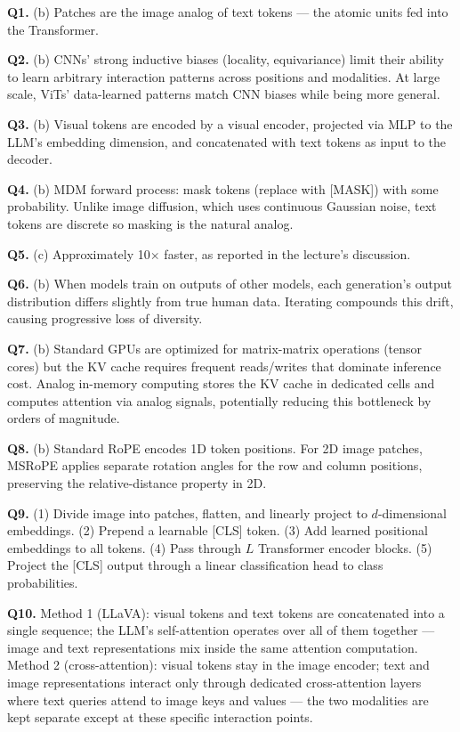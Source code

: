 \documentclass[11pt, a4paper]{article}
\begin{document}
\textbf{Q1.} (b) Patches are the image analog of text tokens --- the atomic units fed into the Transformer.

\textbf{Q2.} (b) CNNs' strong inductive biases (locality, equivariance) limit their ability to learn arbitrary interaction patterns across positions and modalities. At large scale, ViTs' data-learned patterns match CNN biases while being more general.

\textbf{Q3.} (b) Visual tokens are encoded by a visual encoder, projected via MLP to the LLM's embedding dimension, and concatenated with text tokens as input to the decoder.

\textbf{Q4.} (b) MDM forward process: mask tokens (replace with [MASK]) with some probability. Unlike image diffusion, which uses continuous Gaussian noise, text tokens are discrete so masking is the natural analog.

\textbf{Q5.} (c) Approximately 10$\times$ faster, as reported in the lecture's discussion.

\textbf{Q6.} (b) When models train on outputs of other models, each generation's output distribution differs slightly from true human data. Iterating compounds this drift, causing progressive loss of diversity.

\textbf{Q7.} (b) Standard GPUs are optimized for matrix-matrix operations (tensor cores) but the KV cache requires frequent reads/writes that dominate inference cost. Analog in-memory computing stores the KV cache in dedicated cells and computes attention via analog signals, potentially reducing this bottleneck by orders of magnitude.

\textbf{Q8.} (b) Standard RoPE encodes 1D token positions. For 2D image patches, MSRoPE applies separate rotation angles for the row and column positions, preserving the relative-distance property in 2D.

\textbf{Q9.} (1) Divide image into patches, flatten, and linearly project to $d$-dimensional embeddings. (2) Prepend a learnable [CLS] token. (3) Add learned positional embeddings to all tokens. (4) Pass through $L$ Transformer encoder blocks. (5) Project the [CLS] output through a linear classification head to class probabilities.

\textbf{Q10.} Method 1 (LLaVA): visual tokens and text tokens are concatenated into a single sequence; the LLM's self-attention operates over all of them together --- image and text representations mix inside the same attention computation. Method 2 (cross-attention): visual tokens stay in the image encoder; text and image representations interact only through dedicated cross-attention layers where text queries attend to image keys and values --- the two modalities are kept separate except at these specific interaction points.
\end{document}
